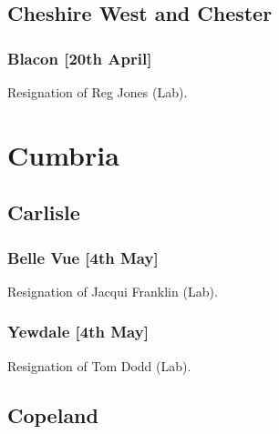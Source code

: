 \documentclass[a4paper,openany]{book}
\begin{document}
\begin{resultsiii}
\subsection*{Cheshire West and Chester}

\subsubsection*{Blacon \hspace*{\fill}\nolinebreak[1]%
\enspace\hspace*{\fill}
[20th April]}


Resignation of Reg Jones (Lab).

\section{Cumbria}

\subsection*{Carlisle}

\subsubsection*{Belle Vue \hspace*{\fill}\nolinebreak[1]%
\enspace\hspace*{\fill}
[4th May]}


Resignation of Jacqui Franklin (Lab).

\subsubsection*{Yewdale \hspace*{\fill}\nolinebreak[1]%
\enspace\hspace*{\fill}
[4th May]}


Resignation of Tom Dodd (Lab).

\subsection*{Copeland}


\end{resultsiii}
\end{document}
